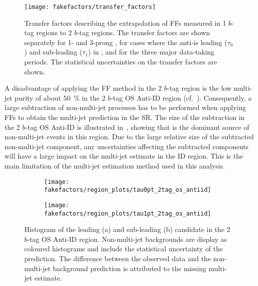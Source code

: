 \begin{figure}[htbp]
  \centering

  \texttt{[image: fakefactors/transfer\_factors]}

  \caption{Transfer factors describing the extrapolation of FFs measured in 1
    $b$-tag regions to 2 $b$-tag regions. The transfer factors are shown
    separately for 1- and 3-prong \tauhadvis, for cases where the
    anti-\tauhadvis is leading ($\tau_0$) and sub-leading ($\tau_1$) in \pT, and
    for the three major data-taking periods.  The statistical uncertainties on
    the transfer factors are shown.}%
  \label{fig:mjfakes_transfer_factor}
\end{figure}

A disadvantage of applying the FF method in the 2 $b$-tag region is the low
multi-jet purity of about \SI{50}{\percent} in the 2 $b$-tag OS Anti-ID region
(cf.\ ). Consequently, a large subtraction of
non-multi-jet processes has to be performed when applying FFs to obtain the
multi-jet prediction in the SR.  The size of the subtraction in the 2 $b$-tag OS
Anti-ID is illustrated in~, showing that
\ttbarFakes is the dominant source of non-multi-jet events in this region. Due
to the large relative size of the subtracted non-multi-jet component, any
uncertainties affecting the subtracted components will have a large impact on
the multi-jet estimate in the ID region. This is the main limitation of the
multi-jet estimation method used in this analysis.

\begin{figure}[htbp]
  \centering

  \begin{subfigure}{0.49\textwidth}
    \texttt{[image: fakefactors/region\_plots/tau0pt\_2tag\_os\_antiid]}
    \subcaption{}
  \end{subfigure}%
  \begin{subfigure}{0.49\textwidth}
    \texttt{[image: fakefactors/region\_plots/tau1pt\_2tag\_os\_antiid]}
    \subcaption{}
  \end{subfigure}

  \caption{Histogram of the leading (a) and sub-leading (b) \tauhadvis candidate
    \pT in the 2 $b$-tag OS Anti-ID region. Non-multi-jet backgrounds are
    display as coloured histograms and include the statistical uncertainty of
    the prediction. The difference between the observed data and the
    non-multi-jet background prediction is attributed to the missing multi-jet
    estimate.}%
  \label{fig:mjfakes_2tag_os_antiid}
\end{figure}


